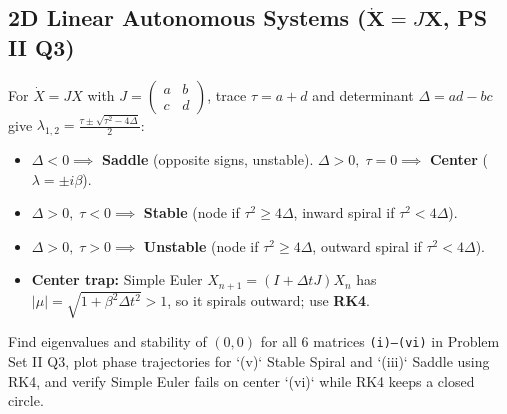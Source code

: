 \documentclass[10pt,a4paper]{article}
\begin{document}
\subsection{2D Linear Autonomous Systems ($\dot{\mathbf{X}} = J\mathbf{X}$, PS II Q3)}
\begin{theorybox}
For $\dot X = JX$ with $J = \begin{pmatrix} a & b \\ c & d \end{pmatrix}$, trace $\tau = a+d$ and determinant $\Delta = ad-bc$ give $\lambda_{1,2} = \frac{\tau \pm \sqrt{\tau^2 - 4\Delta}}{2}$:
\begin{itemize}
\item $\Delta < 0 \implies$ \textbf{Saddle} (opposite signs, unstable). \quad $\Delta > 0,\; \tau = 0 \implies$ \textbf{Center} ($\lambda = \pm i\beta$).
\item $\Delta > 0,\; \tau < 0 \implies$ \textbf{Stable} (node if $\tau^2 \ge 4\Delta$, inward spiral if $\tau^2 < 4\Delta$).
\item $\Delta > 0,\; \tau > 0 \implies$ \textbf{Unstable} (node if $\tau^2 \ge 4\Delta$, outward spiral if $\tau^2 < 4\Delta$).
\item \textbf{Center trap:} Simple Euler $X_{n+1} = (I + \Delta t J)X_n$ has $|\mu| = \sqrt{1+\beta^2\Delta t^2} > 1$, so it spirals outward; use \textbf{RK4}.
\end{itemize}
\end{theorybox}

\begin{goalbox}
Find eigenvalues and stability of $(0,0)$ for all 6 matrices \texttt{(i)--(vi)} in Problem Set II Q3, plot phase trajectories for `(v)` Stable Spiral and `(iii)` Saddle using RK4, and verify Simple Euler fails on center `(vi)` while RK4 keeps a closed circle.
\end{goalbox}
\end{document}
